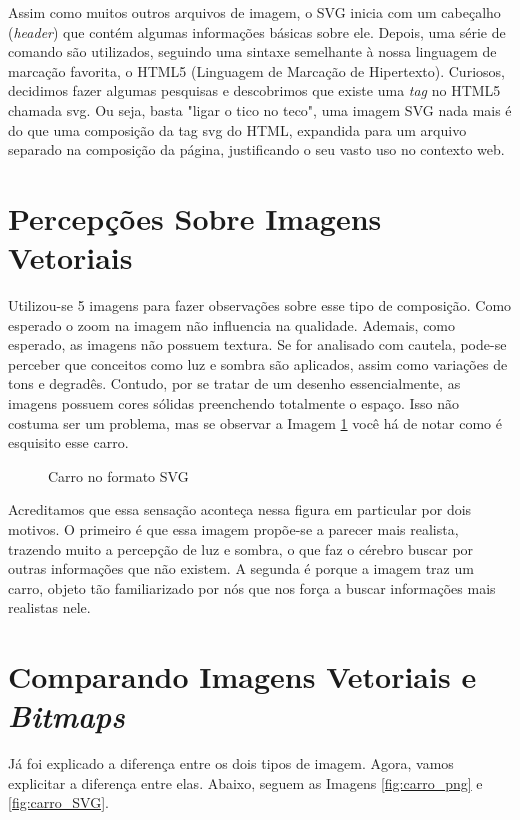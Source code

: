 \hspace{1.5 cm} Assim como muitos outros arquivos de imagem, o SVG inicia com um cabeçalho (\textit{header}) que contém algumas informações básicas sobre ele. Depois, uma série de comando são utilizados, seguindo uma sintaxe semelhante à nossa linguagem de marcação favorita, o HTML5 (Linguagem de Marcação de Hipertexto). Curiosos, decidimos fazer algumas pesquisas e descobrimos que existe uma \textit{tag} no HTML5 chamada svg. Ou seja, basta "ligar o tico no teco", uma imagem SVG nada mais é do que uma composição da tag svg do HTML, expandida para um arquivo separado na composição da página, justificando o seu vasto uso no contexto web.

\section{Percepções Sobre Imagens Vetoriais}
Utilizou-se 5 imagens para fazer observações sobre esse tipo de composição. Como esperado o zoom na imagem não influencia na qualidade. Ademais, como esperado, as imagens não possuem textura. Se for analisado com cautela, pode-se perceber que conceitos como luz e sombra são aplicados, assim como variações de tons e degradês. Contudo, por se tratar de um desenho essencialmente, as imagens possuem cores sólidas preenchendo totalmente o espaço. Isso não costuma ser um problema, mas se observar a Imagem \ref{fig:carro} você há de notar como é esquisito esse carro.

\begin{figure}[h!]
    \centering
    \caption{Carro no formato SVG}
    \label{fig:carro}
    
    

    
\end{figure}

\hspace{1.5 cm} Acreditamos que essa sensação aconteça nessa figura em particular por dois motivos. O primeiro é que essa imagem propõe-se a parecer mais realista, trazendo muito a percepção de luz e sombra, o que faz o cérebro buscar por outras informações que não existem. A segunda é porque a imagem traz um carro, objeto tão familiarizado por nós que nos força a buscar informações mais realistas nele. 

\section{Comparando Imagens Vetoriais e \textit{Bitmaps}}
Já foi explicado a diferença entre os dois tipos de imagem. Agora, vamos explicitar a diferença entre elas. Abaixo, seguem as Imagens \ref{fig:carro_png} e \ref{fig:carro_SVG}.

